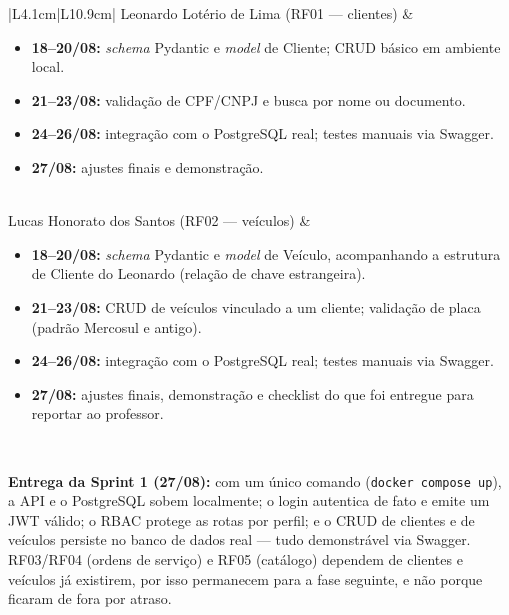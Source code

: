 \documentclass[11pt, a4paper]{article}
\begin{document}
\begin{longtable}{|L{4.1cm}|L{10.9cm}|}
\hline
Leonardo Lotério de Lima \newline (RF01 --- clientes) &
\begin{itemize}[leftmargin=1em, itemsep=2pt, topsep=2pt]
    \item \textbf{18--20/08:} \emph{schema} Pydantic e \emph{model} de Cliente; CRUD básico em ambiente local.
    \item \textbf{21--23/08:} validação de CPF/CNPJ e busca por nome ou documento.
    \item \textbf{24--26/08:} integração com o PostgreSQL real; testes manuais via Swagger.
    \item \textbf{27/08:} ajustes finais e demonstração.
\end{itemize} \\
\hline
Lucas Honorato dos Santos \newline (RF02 --- veículos) &
\begin{itemize}[leftmargin=1em, itemsep=2pt, topsep=2pt]
    \item \textbf{18--20/08:} \emph{schema} Pydantic e \emph{model} de Veículo, acompanhando a estrutura de Cliente do Leonardo (relação de chave estrangeira).
    \item \textbf{21--23/08:} CRUD de veículos vinculado a um cliente; validação de placa (padrão Mercosul e antigo).
    \item \textbf{24--26/08:} integração com o PostgreSQL real; testes manuais via Swagger.
    \item \textbf{27/08:} ajustes finais, demonstração e checklist do que foi entregue para reportar ao professor.
\end{itemize} \\
\hline
\end{longtable}
\endgroup

\noindent\textbf{Entrega da Sprint 1 (27/08):} com um único comando (\texttt{docker compose up}), a API e o PostgreSQL sobem localmente; o login autentica de fato e emite um JWT válido; o RBAC protege as rotas por perfil; e o CRUD de clientes e de veículos persiste no banco de dados real --- tudo demonstrável via Swagger. RF03/RF04 (ordens de serviço) e RF05 (catálogo) dependem de clientes e veículos já existirem, por isso permanecem para a fase seguinte, e não porque ficaram de fora por atraso.
\end{document}
